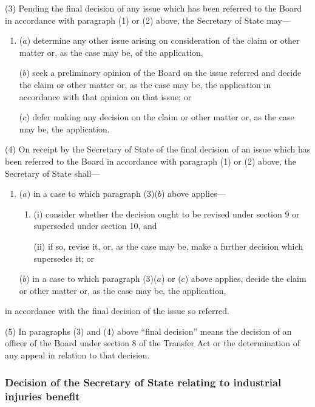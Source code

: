 \documentclass[12pt,a4paper]{article}
\begin{document}
(3) Pending the final decision of any issue which has been referred to the Board in accordance with paragraph (1) or (2) above, the Secretary of State may—
\begin{enumerate}\item[]
($a$) determine any other issue arising on consideration of the claim or other matter or, as the case may be, of the application,

($b$) seek a preliminary opinion of the Board on the issue referred and decide the claim or other matter or, as the case may be, the application in accordance with that opinion on that issue; or

($c$) defer making any decision on the claim or other matter or, as the case may be, the application.
\end{enumerate}

(4) On receipt by the Secretary of State of the final decision of an issue which has been referred to the Board in accordance with paragraph (1) or (2) above, the Secretary of State shall—
\begin{enumerate}\item[]
($a$) in a case to which paragraph (3)($b$) above applies—
\begin{enumerate}\item[]
(i) consider whether the decision ought to be revised under section 9 or superseded under section 10, and

(ii) if so, revise it, or, as the case may be, make a further decision which supersedes it; or
\end{enumerate}

($b$) in a case to which paragraph (3)($a$) or ($c$) above applies, decide the claim or other matter or, as the case may be, the application,
\end{enumerate}
in accordance with the final decision of the issue so referred.

(5) In paragraphs (3) and (4) above “final decision” means the decision of an officer of the Board under section 8 of the Transfer Act or the determination of any appeal in relation to that decision.


\subsubsection[12. Decision of the Secretary of State relating to industrial injuries benefit]{Decision of the Secretary of State relating to industrial injuries benefit}
\end{document}
